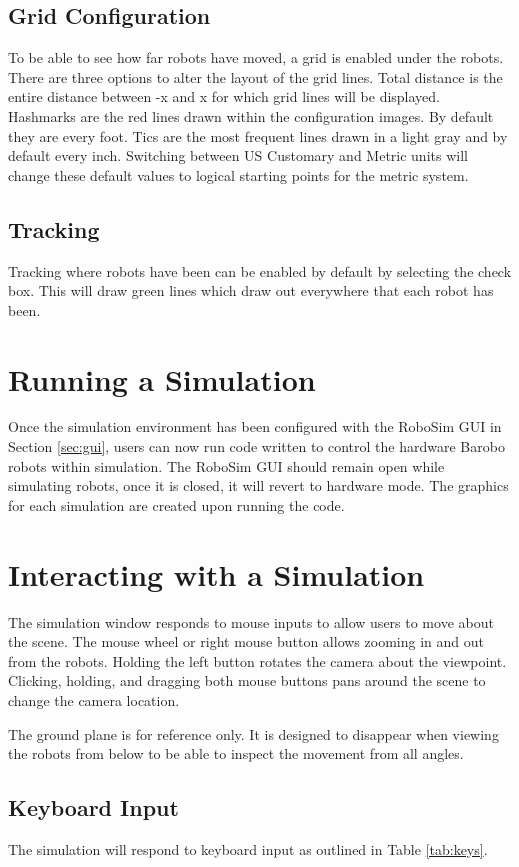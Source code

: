 \documentclass{article}
\begin{document}
\subsection{Grid Configuration}
To be able to see how far robots have moved, a grid is enabled under the robots.
There are three options to alter the layout of the grid lines.  Total distance
is the entire distance between -x and x for which grid lines will be displayed.
Hashmarks are the red lines drawn within the configuration images.  By default
they are every foot.  Tics are the most frequent lines drawn in a light gray
and by default every inch.  Switching between US Customary and Metric units will
change these default values to logical starting points for the metric system.

\subsection{Tracking}
Tracking where robots have been can be enabled by default by selecting the
check box.  This will draw green lines which draw out everywhere that each robot
has been.

\section{Running a Simulation}
Once the simulation environment has been configured with the RoboSim GUI in
Section \ref{sec:gui}, users can now run code written to control the hardware
Barobo robots within simulation.  The RoboSim GUI should remain open while
simulating robots, once it is closed, it will revert to hardware mode.  The
graphics for each simulation are created upon running the code.

\section{Interacting with a Simulation}
The simulation window responds to mouse inputs to allow users to move about the
scene.  The mouse wheel or right mouse button allows zooming in and out from the
robots.  Holding the left button rotates the camera about the viewpoint.
Clicking, holding, and dragging both mouse buttons pans around the scene to
change the camera location.

The ground plane is for reference only.  It is designed to disappear when
viewing the robots from below to be able to inspect the movement from all
angles.

\subsection{Keyboard Input}
The simulation will respond to keyboard input as outlined in Table
\ref{tab:keys}.
\end{document}

